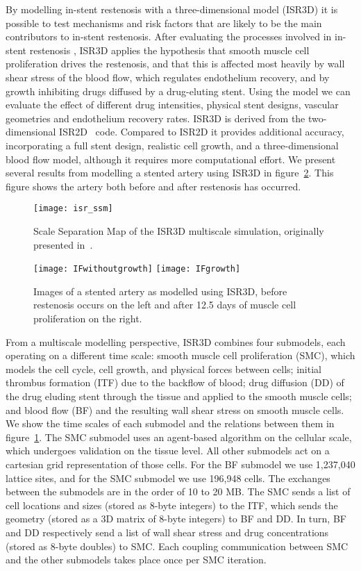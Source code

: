 \documentclass[a4,10pt]{article}
\begin{document}
By modelling in-stent restenosis with a three-dimensional model (ISR3D) it is
possible to test mechanisms and risk factors that are likely to be the main
contributors to in-stent restenosis.  After evaluating the processes involved
in in-stent restenosis \cite{Evans:2008}, ISR3D applies the hypothesis that
smooth muscle cell proliferation drives the restenosis, and that this is
affected most heavily by wall shear stress of the blood flow, which regulates
endothelium recovery, and by growth inhibiting drugs diffused by a drug-eluting
stent. Using the model we can evaluate the effect of different drug
intensities, physical stent designs, vascular geometries and endothelium
recovery rates. ISR3D is derived from the two-dimensional
ISR2D~\cite{Caiazzo:2011,Tahir:2011} code. Compared to ISR2D it provides
additional accuracy, incorporating a full stent design, realistic cell growth,
and a three-dimensional blood flow model, although it requires more
computational effort. We present several results from modelling a stented
artery using ISR3D in figure~\ref{fig:isr:smc}. This figure shows the artery
both before and after restenosis has occurred.

\begin{figure}
  \centering
  \texttt{[image: isr\_ssm]}
  \caption{Scale Separation Map of the ISR3D multiscale simulation, originally 
  presented in~\cite{Borgdorff:2012}.}\label{fig:isr:ssm}
\end{figure}


\begin{figure}
  \centering
  \texttt{[image: IFwithoutgrowth]}
  \texttt{[image: IFgrowth]}
  \caption{Images of a stented artery as modelled using ISR3D, before
restenosis occurs on the left and after 12.5 days of muscle cell proliferation 
on the right.}\label{fig:isr:smc}
\end{figure}

From a multiscale modelling perspective, ISR3D combines four submodels, each
operating on a different time scale: smooth muscle cell proliferation (SMC),
which models the cell cycle, cell growth, and physical forces between cells;
initial thrombus formation (ITF) due to the backflow of blood; drug diffusion
(DD) of the drug eluding stent through the tissue and applied to the smooth
muscle cells; and blood flow (BF) and the resulting wall shear stress on smooth
muscle cells. We show the time scales of each submodel and the relations
between them in figure~\ref{fig:isr:ssm}.  The SMC submodel uses an agent-based
algorithm on the cellular scale, which undergoes validation on the tissue
level. All other submodels act on a cartesian grid representation of those
cells. For the BF submodel we use 1,237,040 lattice sites, and for the SMC
submodel we use 196,948 cells. The exchanges between the submodels are in the
order of 10 to 20 MB. The SMC sends a list of cell locations and sizes 
(stored as 8-byte integers) to the ITF, which sends the geometry (stored as
a 3D matrix of 8-byte integers) to BF and DD. In turn, BF and DD respectively send a list of wall shear
stress and drug concentrations (stored as 8-byte doubles) to SMC. Each 
coupling communication between SMC and  the other submodels takes place
once per SMC iteration. 
\end{document}
